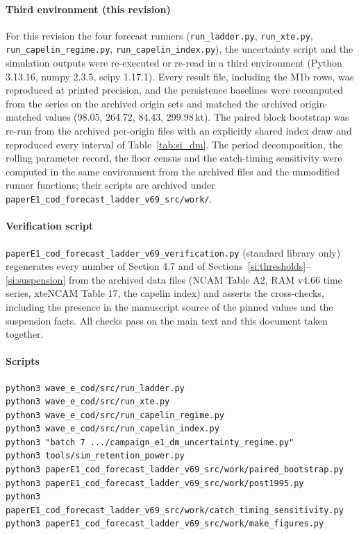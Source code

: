 \documentclass[preprint,11pt,authoryear]{elsarticle}
\theoremstyle{remark}
\begin{document}
\paragraph{Third environment (this revision)} For this revision the four forecast runners (\texttt{run\_ladder.py}, \texttt{run\_xte.py}, \texttt{run\_capelin\_regime.py}, \texttt{run\_capelin\_index.py}), the uncertainty script and the simulation outputs were re-executed or re-read in a third environment (Python 3.13.16, numpy 2.3.5, scipy 1.17.1). Every result file, including the M1b rows, was reproduced at printed precision, and the persistence baselines were recomputed from the series on the archived origin sets and matched the archived origin-matched values (98.05, 264.72, 84.43, 299.98\,kt). The paired block bootstrap was re-run from the archived per-origin files with an explicitly shared index draw and reproduced every interval of Table~\ref{tab:si_dm}. The period decomposition, the rolling parameter record, the floor census and the catch-timing sensitivity were computed in the same environment from the archived files and the unmodified runner functions; their scripts are archived under \texttt{paperE1\_cod\_forecast\_ladder\_v69\_src/work/}.

\paragraph{Verification script} \texttt{paperE1\_cod\_forecast\_ladder\_v69\_verification.py} (standard library only) regenerates every number of Section 4.7 and of Sections~\ref{si:thresholds}--\ref{si:suspension} from the archived data files (NCAM Table A2, RAM v4.66 time series, xteNCAM Table 17, the capelin index) and asserts the cross-checks, including the presence in the manuscript source of the pinned values and the suspension facts. All checks pass on the main text and this document taken together.

\paragraph{Scripts}
\begin{verbatim}
python3 wave_e_cod/src/run_ladder.py
python3 wave_e_cod/src/run_xte.py
python3 wave_e_cod/src/run_capelin_regime.py
python3 wave_e_cod/src/run_capelin_index.py
python3 "batch 7 .../campaign_e1_dm_uncertainty_regime.py"
python3 tools/sim_retention_power.py
python3 paperE1_cod_forecast_ladder_v69_src/work/paired_bootstrap.py
python3 paperE1_cod_forecast_ladder_v69_src/work/post1995.py
python3 paperE1_cod_forecast_ladder_v69_src/work/catch_timing_sensitivity.py
python3 paperE1_cod_forecast_ladder_v69_src/work/make_figures.py
\end{verbatim}
\end{document}
